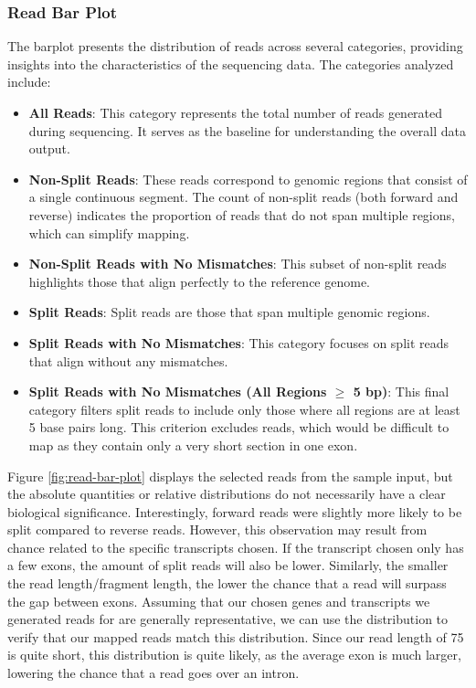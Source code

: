 \documentclass{article}
\begin{document}
    \subsubsection{Read Bar Plot}


    The barplot presents the distribution of reads across several categories, providing insights into the characteristics of the sequencing data. The categories analyzed include:

    \begin{itemize}
        \item \textbf{All Reads}: This category represents the total number of reads generated during sequencing. It serves as the baseline for understanding the overall data output.

        \item \textbf{Non-Split Reads}: These reads correspond to genomic regions that consist of a single continuous segment. The count of non-split reads (both forward and reverse) indicates the proportion of reads that do not span multiple regions, which can simplify mapping.

        \item \textbf{Non-Split Reads with No Mismatches}: This subset of non-split reads highlights those that align perfectly to the reference genome.

        \item \textbf{Split Reads}: Split reads are those that span multiple genomic regions.

        \item \textbf{Split Reads with No Mismatches}: This category focuses on split reads that align without any mismatches.

        \item \textbf{Split Reads with No Mismatches (All Regions $\geq$ 5 bp)}: This final category filters split reads to include only those where all regions are at least 5 base pairs long. This criterion excludes reads, which would be difficult to map as they contain only a very short section in one exon.
    \end{itemize}

    Figure \ref{fig:read-bar-plot} displays the selected reads from the sample input, but the absolute quantities or relative distributions do not necessarily have a clear biological significance. Interestingly, forward reads were slightly more likely to be split compared to reverse reads. However, this observation may result from chance related to the specific transcripts chosen. If the transcript chosen only has a few exons, the amount of split reads will also be lower. Similarly, the smaller the read length/fragment length, the lower the chance that a read will surpass the gap between exons. Assuming that our chosen genes and transcripts we generated reads for are generally representative, we can use the distribution to verify that our mapped reads match this distribution. Since our read length of 75 is quite short, this distribution is quite likely, as the average exon is much larger, lowering the chance that a read goes over an intron.
\end{document}
